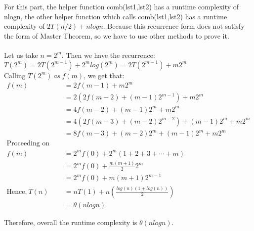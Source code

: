 \documentclass[12pt]{article}
\begin{document}
\begin{enumerate}
\begin{verbatim}
\end{verbatim}
For this part, the helper function comb(lst1,lst2) has a runtime complexity of nlogn, the other helper function which calls comb(lst1,lst2) has a runtime complexity of $2T(n/2)+nlogn$. Because this recurrence form does not satisfy the form of Master Theorem, so we have to use other methods to prove it.\\\\
Let us take $n=2^m$. Then we have the recurrence:\\
$T(2^m)=2T(2^{m-1})+2^m log(2^m)=2T(2^{m-1})+m2^m$\\
Calling $T(2^m)\ as\ f(m)$, we get that:
\begin{align*}
f(m)&=2f(m-1)+m2^m\\
&=2(2f(m-2)+(m-1)2^{m-1})+m2^m\\
&=4f(m-2)+(m-1)2^m+m2^m\\
&=4(2f(m-3)+(m-2)2^{m-2})+(m-1)2^m+m2^m\\
&=8f(m-3)+(m-2)2^m+(m-1)2^m+m2^m\\
\text{Proceeding on these lines, we get that:}\\
f(m)&=2^mf(0)+2^m(1+2+3+⋯+m)\\
&=2^mf(0)+\frac{m(m+1)}{2}2^m\\
&=2^mf(0)+m(m+1)2^{m-1}\\
\text{Hence,}\ T(n)&=nT(1)+n(\frac{log(n)(1+log(n))}{2})\\
&=\theta (nlogn)
\end{align*}
\end{enumerate}
Therefore, overall the runtime complexity is $\theta (nlogn)$.
\end{document}
